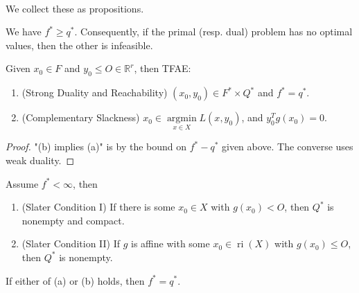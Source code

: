 \paragraph{}We collect these as propositions.

\begin{prop}\label{prop:042-weak-duality}
	We have $f^\ast\geq q^\ast$. Consequently, if the primal (resp. dual) problem has no optimal values, then the other is infeasible.
\end{prop}

\begin{prop}\label{prop:042-complementary-slackness}
	Given $x_0\in F$ and $y_0\leq O\in \mathbb{R}^r$, then TFAE:
	\begin{enumerate}[label=(\alph*)]
		\item (Strong Duality and Reachability) $(x_0,y_0)\in F^\ast\times Q^\ast$ and $f^\ast=q^\ast$.
		\item (Complementary Slackness) $x_0\in \underset{x\in X}{\operatorname{argmin}}L(x,y_0)$, and $y_0^Tg(x_0)=0$.
	\end{enumerate}
\end{prop}

\begin{proof}
	"(b) implies (a)" is by the bound on $f^\ast - q^\ast$ given above. The converse uses weak duality.
\end{proof}

\begin{prop}\label{prop:042-slater-optimality}
	Assume $f^\ast<\infty$, then
	\begin{enumerate}[label=(\alph*)]
		\item (Slater Condition I) If there is some $x_0\in X$ with $g(x_0)<O$, then $Q^\ast$ is nonempty and compact.
		\item (Slater Condition II) If $g$ is affine with some $x_0\in \operatorname{ri}(X)$ with $g(x_0)\leq O$, then $Q^\ast$ is nonempty.
	\end{enumerate}
	If either of (a) or (b) holds, then $f^\ast=q^\ast$.
\end{prop}
